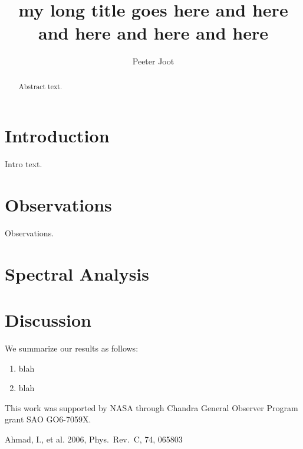 \documentclass[iop,tighten]{emulateapj}
\begin{document}
\title{my long title
goes here and here and here and here and here}

\author{
Peeter Joot 
}


\begin{abstract}

Abstract text.

\end{abstract}


\section{Introduction}
\label{intro}

Intro text.

\section{Observations}
\label{obssec}

Observations.

\section{Spectral Analysis}

\section{Discussion}

We summarize our results as follows:
\begin{enumerate}

\item blah

\item blah

\end{enumerate}

\acknowledgments

This work was supported by NASA through Chandra General Observer
Program grant SAO GO6-7059X.

\begin{thebibliography}{}

Ahmad, I., et al. 2006, Phys.~Rev.~C, 74, 065803

\end{thebibliography}
\end{document}
